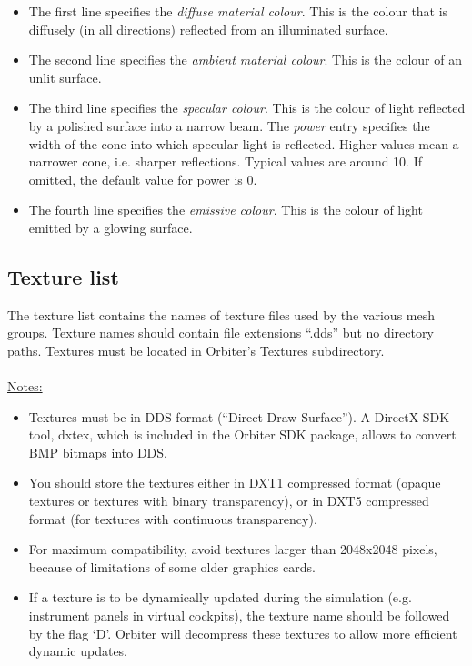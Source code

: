 \documentclass[Orbiter Developer Manual.tex]{subfiles}
\begin{document}
\begin{itemize}
\item The first line specifies the \textit{diffuse material colour}. This is the colour that is diffusely (in all directions) reflected from an illuminated surface.
\item The second line specifies the \textit{ambient material colour}. This is the colour of an unlit surface.
\item The third line specifies the \textit{specular colour}. This is the colour of light reflected by a polished surface into a narrow beam. The \textit{power} entry specifies the width of the cone into which specular light is reflected. Higher values mean a narrower cone, i.e. sharper reflections. Typical values are around 10. If omitted, the default value for power is 0.
\item The fourth line specifies the \textit{emissive colour}. This is the colour of light emitted by a glowing surface.
\end{itemize}


\subsection{Texture list}
The texture list contains the names of texture files used by the various mesh groups. Texture names should contain file extensions “.dds” but no directory paths. Textures must be located in Orbiter’s Textures subdirectory.\\
\\
\underline{Notes:}

\begin{itemize}
\item Textures must be in DDS format (“Direct Draw Surface”). A DirectX SDK tool, dxtex, which is included in the Orbiter SDK package, allows to convert BMP bitmaps into DDS.
\item You should store the textures either in DXT1 compressed format (opaque textures or textures with binary transparency), or in DXT5 compressed format (for textures with continuous transparency).
\item For maximum compatibility, avoid textures larger than 2048x2048 pixels, because of limitations of some older graphics cards.
\item If a texture is to be dynamically updated during the simulation (e.g. instrument panels in virtual cockpits), the texture name should be followed by the flag ‘D’. Orbiter will decompress these textures to allow more efficient dynamic updates.
\end{itemize}
\end{document}
